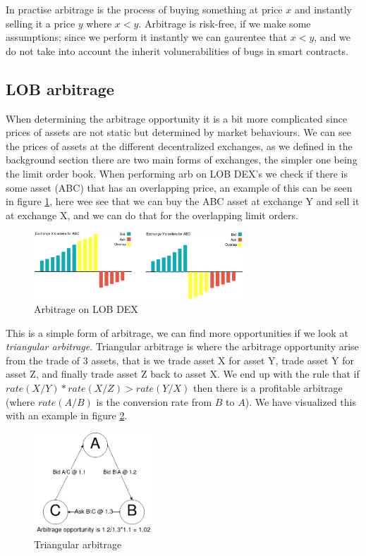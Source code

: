 In practise arbitrage is the process of buying something at price $x$ and instantly selling it a price $y$ where $x<y$. Arbitrage is risk-free, if we make some assumptions; since we perform it instantly we can gaurentee that $x<y$, and we do not take into account the inherit volunerabilities of bugs in smart contracts.

\subsection{LOB arbitrage}

When determining the arbitrage opportunity it is a bit more complicated since prices of assets are not static but determined by market behaviours. We can see the prices of assets at the different decentralized exchanges, as we defined in the background section there are two main forms of exchanges, the simpler one being the limit order book. When performing arb on LOB DEX's we check if there is some asset (ABC) that has an overlapping price, an example of this can be seen in figure \ref{fig:ArbLOB}, here wee see that we can buy the ABC asset at exchange Y and sell it at exchange X, and we can do that for the overlapping limit orders. 
\begin{figure}[h]
\centering
\includegraphics[width=0.7\textwidth]{assests/Flash-loans-Arbitrage-Overlap-1}
\caption{Arbitrage on LOB DEX}
\label{fig:ArbLOB}
\end{figure}
This is a simple form of arbitrage, we can find more opportunities if we look at \textit{triangular arbitrage}. Triangular arbitrage is where the arbitrage opportunity arise from the trade of 3 assets, that is we trade asset X for asset Y, trade asset Y for asset Z, and finally trade asset Z back to asset X. We end up with the rule that if $rate(X/Y)*rate(X/Z)>rate(Y/X)$ then there is a profitable arbitrage (where $rate(A/B)$ is the conversion rate from $B$ to $A$). We have visualized this with an example in figure \ref{fig:ArbTrig}.
\begin{figure}[h]
\centering
\includegraphics[width=0.4\textwidth]{assests/Flash-loans-Arbitrage-triangular}
\caption{Triangular arbitrage}
\label{fig:ArbTrig}
\end{figure}


